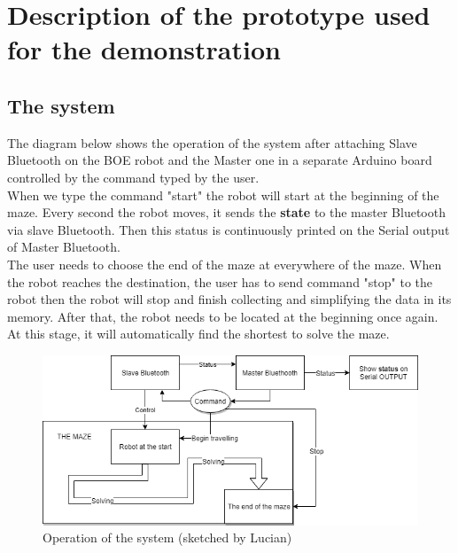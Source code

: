 \documentclass{article}
\begin{document}
\newpage
\section{Description of the prototype used for the demonstration}
\subsection{The system}
The diagram below shows the operation of the system after attaching Slave Bluetooth on the BOE robot and the Master one in a separate Arduino board controlled by the command typed by the user.\\
When we type the command "start" the robot will start at the beginning of the maze. Every second the robot moves, it sends the \textbf{state} to the master Bluetooth via slave Bluetooth. Then this status is continuously printed on the Serial output of Master Bluetooth.\\
The user needs to choose the end of the maze at everywhere of the maze. When the robot reaches the destination, the user has to send command "stop" to the robot then the robot will stop and finish collecting and simplifying the data in its memory. After that, the robot needs to be located at the beginning once again. At this stage, it will automatically find the shortest to solve the maze.\\  
\begin{figure}[h!]
	\centering
	\includegraphics[width=500pt]{pic6.png}
	\caption{Operation of the system (sketched by Lucian)}
\end{figure}
\newpage
\end{document}
